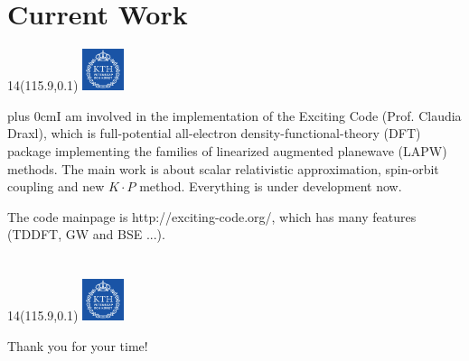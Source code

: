 \documentclass[]{beamer}
\newcommand{\MyLogo}{%
\begin{textblock}{14}(115.9,0.1)
  \includegraphics[width=1.22cm]{kth_rgb}
 \end{textblock}
}
\renewcommand{\raggedright}{\leftskip=0pt \rightskip=0pt plus 0cm}
\begin{document}
\section{Current Work}
\begin{frame}
\MyLogo

\raggedright {I am involved in the implementation of the Exciting Code (Prof. Claudia Draxl), which is full-potential all-electron density-functional-theory (DFT) package implementing the families of linearized augmented planewave (LAPW) methods.
The main work is about scalar relativistic approximation, spin-orbit coupling and new $K \cdot P $ method. Everything is under development now.}

\vspace*{3\baselineskip}

The code mainpage is http://exciting-code.org/, which has many features (TDDFT, GW and BSE ...).

\end{frame}


\section{}
\begin{frame}
\MyLogo
\begin{center}
 \Huge Thank you for your time!
\end{center}
\end{frame}
\end{document}
